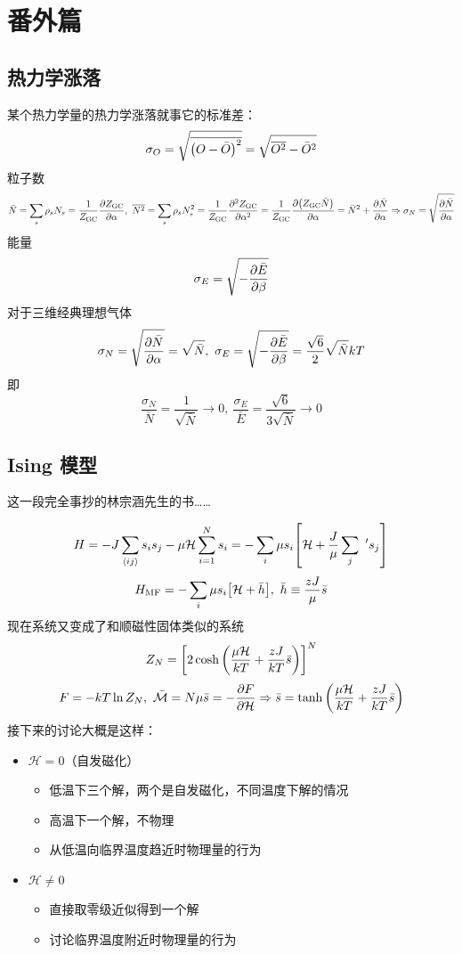 \section{番外篇}

\subsection{热力学涨落}

某个热力学量的热力学涨落就事它的标准差：\[
\sigma_{O} = \sqrt{\overline{\qty(O - \bar{O})^2}} = \sqrt{\overline{O^2} - \bar{O}^2}
\] 粒子数 \[
\bar{N} = \sum_s \rho_s N_s = \frac{1}{Z_{\text{GC}}} \pdv{Z_{\text{GC}}}{\alpha},\ \overline{N^2} = \sum_s \rho_s N_s^2 = \frac{1}{Z_{\text{GC}}}\pdv[2]{Z_{\text{GC}}}{\alpha} = \frac{1}{Z_{\text{GC}}} \pdv{\qty(Z_{\text{GC}} \bar{N})}{\alpha} = \bar{N}^2 + \pdv{\bar{N}}{\alpha} \Rightarrow \sigma_{N} = \sqrt{\pdv{\bar{N}}{\alpha}}
\] 能量 \[
\sigma_{E} = \sqrt{- \pdv{\bar{E}}{\beta}}
\] 对于三维经典理想气体 \[
\sigma_{N} = \sqrt{\pdv{\bar{N}}{\alpha}} = \sqrt{\bar{N}},\ \sigma_{E} = \sqrt{- \pdv{\bar{E}}{\beta}} = \frac{\sqrt{6}}{2} \sqrt{\bar{N}} k T
\] 即 \[
\frac{\sigma_{N}}{\bar{N}} = \frac{1}{\sqrt{\bar{N}}} \to 0,\ \frac{\sigma_{E}}{\bar{E}} = \frac{\sqrt{6}}{3 \sqrt{\bar{N}}} \to 0
\]

\subsection{Ising 模型}

这一段完全事抄的林宗涵先生的书……

\[
H = - J \sum_{\expval{i j}}s_i s_j - \mu \mathcal{H} \sum_{i = 1}^N s_i = - \sum_i \mu s_i \qty[\mathcal{H} + \frac{J}{\mu} \sum_j \ ' s_j]
\] \[
H_{\text{MF}} = - \sum_i \mu s_i \qty[\mathcal{H} + \bar{h}],\ \bar{h} \equiv \frac{z J}{\mu} \bar{s}
\] 现在系统又变成了和顺磁性固体类似的系统 \[
Z_N = \qty[2 \cosh \qty(\frac{\mu \mathcal{H}}{k T} + \frac{z J}{k T} \bar{s})]^N
\] \[
F = - k T \ln{Z_N},\ \bar{\mathcal{M}} = N \mu \bar{s} = - \pdv{F}{\mathcal{H}} \Rightarrow \bar{s} = \tanh \qty(\frac{\mu \mathcal{H}}{k T} + \frac{z J}{k T} \bar{s})
\] 接下来的讨论大概是这样：\begin{itemize}
    \item $\mathcal{H} = 0$（自发磁化） \begin{itemize}
        \item 低温下三个解，两个是自发磁化，不同温度下解的情况
        \item 高温下一个解，不物理
        \item 从低温向临界温度趋近时物理量的行为
    \end{itemize}
    \item $\mathcal{H} \neq 0$ \begin{itemize}
        \item 直接取零级近似得到一个解
        \item 讨论临界温度附近时物理量的行为
    \end{itemize}
\end{itemize}